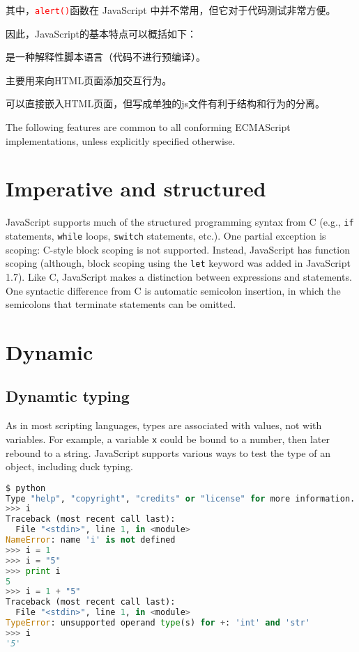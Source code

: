 其中，\textcolor{Red}{\texttt{alert()}}函数在 JavaScript 中并不常用，但它对于代码测试非常方便。




因此，JavaScript的基本特点可以概括如下：

\begin{compactitem}
\item 是一种解释性脚本语言（代码不进行预编译）。
\item 主要用来向HTML页面添加交互行为。
\item 可以直接嵌入HTML页面，但写成单独的js文件有利于结构和行为的分离。
\end{compactitem}




The following features are common to all conforming ECMAScript implementations, unless explicitly specified otherwise.


\section{Imperative and structured}


JavaScript supports much of the structured programming syntax from C (e.g., \texttt{if} statements, \texttt{while} loops, \texttt{switch} statements, etc.). One partial exception is scoping: C-style block scoping is not supported. Instead, JavaScript has function scoping (although, block scoping using the \texttt{let} keyword was added in JavaScript 1.7). Like C, JavaScript makes a distinction between expressions and statements. One syntactic difference from C is automatic semicolon insertion, in which the semicolons that terminate statements can be omitted.





\section{Dynamic}


\subsection{Dynamtic typing}

As in most scripting languages, types are associated with values, not with variables. For example, a variable \texttt{x} could be bound to a number, then later rebound to a string. JavaScript supports various ways to test the type of an object, including duck typing.

\begin{lstlisting}[language=Python]
$ python
Type "help", "copyright", "credits" or "license" for more information.
>>> i
Traceback (most recent call last):
  File "<stdin>", line 1, in <module>
NameError: name 'i' is not defined
>>> i = 1
>>> i = "5"
>>> print i
5
>>> i = 1 + "5"
Traceback (most recent call last):
  File "<stdin>", line 1, in <module>
TypeError: unsupported operand type(s) for +: 'int' and 'str'
>>> i 
'5'
\end{lstlisting}



